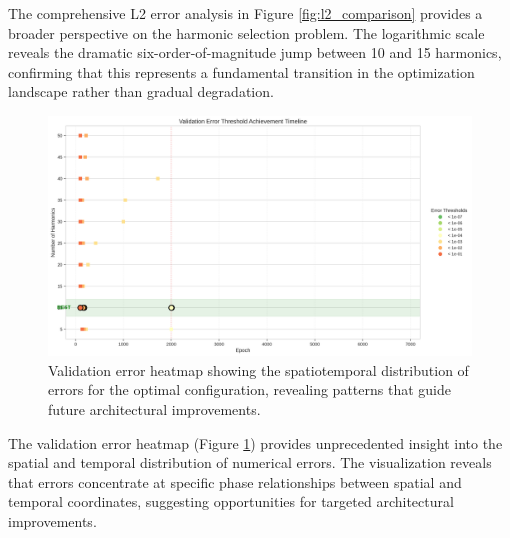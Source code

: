 The comprehensive L2 error analysis in Figure \ref{fig:l2_comparison} provides a broader perspective on the harmonic selection problem. The logarithmic scale reveals the dramatic six-order-of-magnitude jump between 10 and 15 harmonics, confirming that this represents a fundamental transition in the optimization landscape rather than gradual degradation.

\begin{figure}[ht]
    \centering
    \includegraphics[width = 1.0\linewidth]{figures/validation_error_heatmap.png}
    \caption{Validation error heatmap showing the spatiotemporal distribution of errors for the optimal configuration, revealing patterns that guide future architectural improvements.}
    \label{fig:validation_heatmap}
\end{figure}

The validation error heatmap (Figure \ref{fig:validation_heatmap}) provides unprecedented insight into the spatial and temporal distribution of numerical errors. The visualization reveals that errors concentrate at specific phase relationships between spatial and temporal coordinates, suggesting opportunities for targeted architectural improvements.


